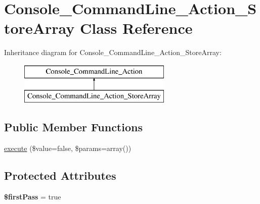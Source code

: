 \hypertarget{class_console___command_line___action___store_array}{
\section{Console\_\-CommandLine\_\-Action\_\-StoreArray Class Reference}
\label{class_console___command_line___action___store_array}
}
Inheritance diagram for Console\_\-CommandLine\_\-Action\_\-StoreArray:\begin{figure}[H]
\begin{center}
\leavevmode
\includegraphics[height=2.000000cm]{class_console___command_line___action___store_array}
\end{center}
\end{figure}
\subsection*{Public Member Functions}
\begin{DoxyCompactItemize}
\item 
\hyperlink{class_console___command_line___action___store_array_a37f62eb63fef4cc7c2d5f438190b307a}{execute} (\$value=false, \$params=array())
\end{DoxyCompactItemize}
\subsection*{Protected Attributes}
\begin{DoxyCompactItemize}
\item 
\hypertarget{class_console___command_line___action___store_array_a7b07071ecedb1ef64667f9065ace4a14}{
{\bfseries \$firstPass} = true}
\label{class_console___command_line___action___store_array_a7b07071ecedb1ef64667f9065ace4a14}

\end{DoxyCompactItemize}



